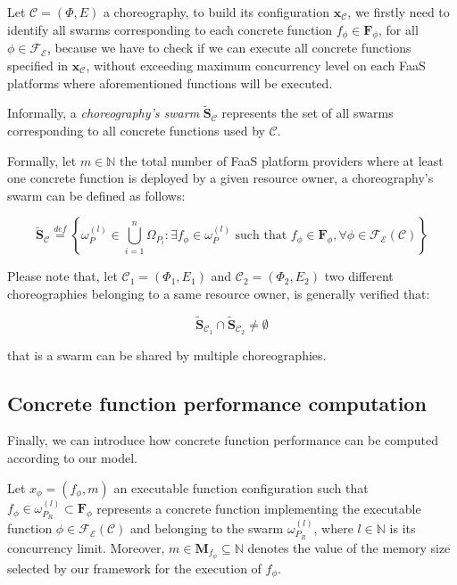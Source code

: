 \documentclass[12pt,a4paper]{report}
\newcommand{\mathDef}{\overset{\textit{def}}{=}}
\newcommand{\N}{\mathbb{N}}
\begin{document}
Let $\mathcal{C} = (\Phi,E)$ a choreography, to build its configuration $\textbf{x}_{\mathcal{C}}$, we firstly need to identify all swarms corresponding to each concrete function $f_{\phi} \in \textbf{F}_{\phi}$, for all $\phi \in \mathscr{F_E}$, because we have to check if we can execute all concrete functions specified in $\textbf{x}_{\mathcal{C}}$, without exceeding maximum concurrency level on each FaaS platforms where aforementioned functions will be executed.

Informally, a \textit{choreography's swarm} $\widetilde{\textbf{S}}_{\mathcal{C}}$ represents the set of all swarms corresponding to all concrete functions used by $\mathcal{C}$. 

Formally, let $m \in \N$ the total number of FaaS platform providers where at least one concrete function is deployed by a given resource owner, a choreography's swarm can be defined as follows:

\begin{equation}
	\widetilde{\textbf{S}}_{\mathcal{C}} \mathDef \left\{ \omega_{P}^{(l)} \in \bigcup_{i=1}^n \Omega_{P_i} : \exists f_{\phi} \in \omega_{P}^{(l)} \text{ such that } f_{\phi} \in \textbf{F}_{\phi}, \forall \phi \in \mathscr{F_E}(\mathcal{C}) \right\}
\end{equation}

Please note that, let $\mathcal{C}_1 = (\Phi_1,E_1)$ and $\mathcal{C}_2 = (\Phi_2,E_2)$ two different choreographies belonging to a same resource owner, is generally verified that:

\begin{equation}
	\widetilde{\textbf{S}}_{\mathcal{C}_1} \cap \widetilde{\textbf{S}}_{\mathcal{C}_2} \neq \emptyset
\end{equation}

that is a swarm can be shared by multiple choreographies.

\subsection{Concrete function performance computation}

Finally, we can introduce how concrete function performance can be computed according to our model.

Let $x_{\phi} = (f_{\phi},m)$ an executable function configuration such that $f_{\phi} \in \omega_{P_R}^{(l)} \subset \textbf{F}_{\phi}$ represents a concrete function implementing the executable function $\phi \in \mathscr{F_E}(\mathcal{C})$ and belonging to the swarm $\omega_{P_R}^{(l)}$, where $l \in \N$ is its concurrency limit. Moreover, $m \in \textbf{M}_{f_{\phi}} \subseteq \N$ denotes the value of the memory size selected by our framework for the execution of $f_{\phi}$.
\end{document}
